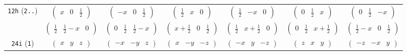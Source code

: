 \documentclass[fleqn,9pt,landscape]{jsarticle}
\begin{document}
\begin{center}
\begin{longtable}{ccccccc}
{\tt 12h} ({\tt 2..}) & $ \begin{pmatrix} x & 0 & \frac{1}{2} \end{pmatrix} $ & $ \begin{pmatrix} - x & 0 & \frac{1}{2} \end{pmatrix} $ & $ \begin{pmatrix} \frac{1}{2} & x & 0 \end{pmatrix} $ & $ \begin{pmatrix} \frac{1}{2} & - x & 0 \end{pmatrix} $ & $ \begin{pmatrix} 0 & \frac{1}{2} & x \end{pmatrix} $ & $ \begin{pmatrix} 0 & \frac{1}{2} & - x \end{pmatrix} $ \\
& $ \begin{pmatrix} \frac{1}{2} & \frac{1}{2} - x & 0 \end{pmatrix} $ & $ \begin{pmatrix} 0 & \frac{1}{2} & \frac{1}{2} - x \end{pmatrix} $ & $ \begin{pmatrix} x + \frac{1}{2} & 0 & \frac{1}{2} \end{pmatrix} $ & $ \begin{pmatrix} \frac{1}{2} & x + \frac{1}{2} & 0 \end{pmatrix} $ & $ \begin{pmatrix} 0 & \frac{1}{2} & x + \frac{1}{2} \end{pmatrix} $ & $ \begin{pmatrix} \frac{1}{2} - x & 0 & \frac{1}{2} \end{pmatrix} $ \\ \hline
{\tt 24i} ({\tt 1}) & $ \begin{pmatrix} x & y & z \end{pmatrix} $ & $ \begin{pmatrix} - x & - y & z \end{pmatrix} $ & $ \begin{pmatrix} x & - y & - z \end{pmatrix} $ & $ \begin{pmatrix} - x & y & - z \end{pmatrix} $ & $ \begin{pmatrix} z & x & y \end{pmatrix} $ & $ \begin{pmatrix} - z & - x & y \end{pmatrix} $ \\

\end{longtable}
\end{center}
\end{document}
